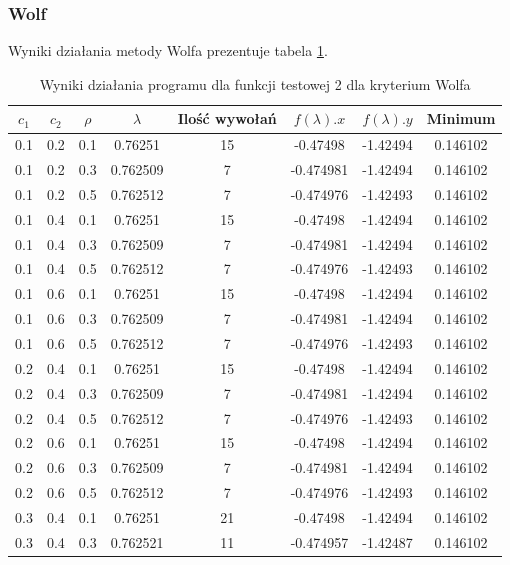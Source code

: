 \documentclass{classrep}
\begin{document}
\subsubsection{Wolf}

Wyniki działania metody Wolfa prezentuje tabela \ref{wolf2}.

\begin{table}
  \centering
  \caption{Wyniki działania programu dla funkcji testowej 2 dla kryterium Wolfa}
  \label{wolf2}
  \begin{tabular}{|c|c|c|c|c|c|c|c|}
    \hline
    $c_1$ & $c_2$ & $\rho$ & $\lambda$ & Ilość wywołań & $f(\lambda).x$ & $f(\lambda).y$ & Minimum \\
    \hline
    0.1 & 0.2 & 0.1 & 0.76251 & 15 & -0.47498 & -1.42494 & 0.146102 \\
    0.1 & 0.2 & 0.3 & 0.762509 & 7 & -0.474981 & -1.42494 & 0.146102 \\
    0.1 & 0.2 & 0.5 & 0.762512 & 7 & -0.474976 & -1.42493 & 0.146102 \\
    0.1 & 0.4 & 0.1 & 0.76251 & 15 & -0.47498 & -1.42494 & 0.146102 \\
    0.1 & 0.4 & 0.3 & 0.762509 & 7 & -0.474981 & -1.42494 & 0.146102 \\
    0.1 & 0.4 & 0.5 & 0.762512 & 7 & -0.474976 & -1.42493 & 0.146102 \\
    0.1 & 0.6 & 0.1 & 0.76251 & 15 & -0.47498 & -1.42494 & 0.146102 \\
    0.1 & 0.6 & 0.3 & 0.762509 & 7 & -0.474981 & -1.42494 & 0.146102 \\
    0.1 & 0.6 & 0.5 & 0.762512 & 7 & -0.474976 & -1.42493 & 0.146102 \\
    0.2 & 0.4 & 0.1 & 0.76251 & 15 & -0.47498 & -1.42494 & 0.146102 \\
    0.2 & 0.4 & 0.3 & 0.762509 & 7 & -0.474981 & -1.42494 & 0.146102 \\
    0.2 & 0.4 & 0.5 & 0.762512 & 7 & -0.474976 & -1.42493 & 0.146102 \\
    0.2 & 0.6 & 0.1 & 0.76251 & 15 & -0.47498 & -1.42494 & 0.146102 \\
    0.2 & 0.6 & 0.3 & 0.762509 & 7 & -0.474981 & -1.42494 & 0.146102 \\
    0.2 & 0.6 & 0.5 & 0.762512 & 7 & -0.474976 & -1.42493 & 0.146102 \\
    0.3 & 0.4 & 0.1 & 0.76251 & 21 & -0.47498 & -1.42494 & 0.146102 \\
    0.3 & 0.4 & 0.3 & 0.762521 & 11 & -0.474957 & -1.42487 & 0.146102 \\

\end{tabular}
\end{table}
\end{document}

